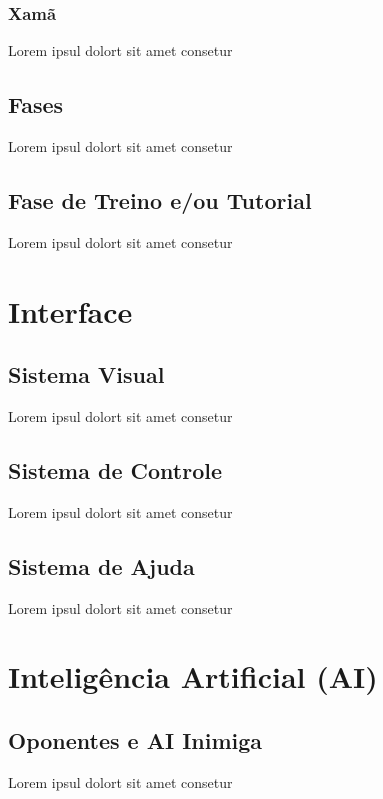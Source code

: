 \subsection{Xamã}

Lorem ipsul dolort sit amet consetur

\section{Fases}

Lorem ipsul dolort sit amet consetur


\section{Fase de Treino e/ou Tutorial}

Lorem ipsul dolort sit amet consetur

\chapter{Interface}

\section{Sistema Visual}

Lorem ipsul dolort sit amet consetur


\section{Sistema de Controle}

Lorem ipsul dolort sit amet consetur

\section{Sistema de Ajuda}

Lorem ipsul dolort sit amet consetur

\chapter{Inteligência Artificial (AI)}


\section{Oponentes e AI Inimiga}

Lorem ipsul dolort sit amet consetur

